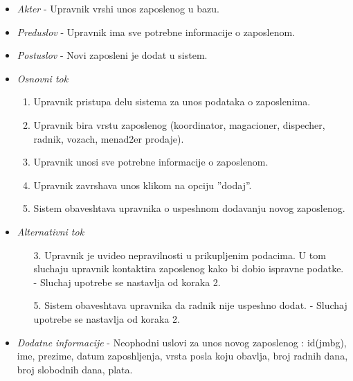 \documentclass[10 pt]{article}
\begin{document}
		\begin{itemize}
			\item\textit{Akter} - Upravnik vrshi unos zaposlenog u bazu.

			
			\item\textit{Preduslov} - Upravnik ima sve potrebne informacije o zaposlenom.

			
			\item\textit{Postuslov} - Novi zaposleni je dodat u sistem.

			
			\item\textit{Osnovni tok}
				\begin{enumerate}
					\item Upravnik pristupa delu sistema za unos podataka o zaposlenima.

					\item Upravnik bira vrstu zaposlenog (koordinator, magacioner, dispecher, radnik, vozach, menad2er prodaje).

					\item Upravnik unosi sve potrebne informacije o zaposlenom.

					\item Upravnik zavrshava unos klikom na opciju ''dodaj''.

					\item Sistem obaveshtava upravnika o uspeshnom dodavanju novog zaposlenog.

				\end{enumerate}
			
			\item\textit{Alternativni tok}
				\begin{enumerate}
					\item [3.] Upravnik je uvideo nepravilnosti u prikupljenim podacima. U tom sluchaju upravnik kontaktira zaposlenog kako bi dobio ispravne podatke.
- Sluchaj upotrebe se nastavlja od koraka 2.

					\item [5.] Sistem obaveshtava upravnika  da radnik nije uspeshno dodat. - Sluchaj upotrebe se nastavlja  od koraka 2.

				\end{enumerate}
				
			\item\textit{Dodatne informacije} - Neophodni uslovi za unos novog zaposlenog : id(jmbg), ime, prezime, datum zaposhljenja, vrsta posla koju obavlja, broj radnih dana, broj slobodnih dana, plata.

			
		\end{itemize}
	
\end{document}
